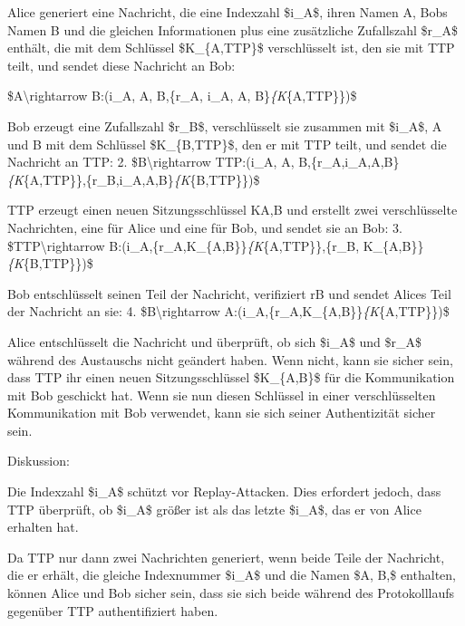 \documentclass[a4paper]{article}
\begin{document}
\begin{multicols}{3}
\begin{itemize*}
            \begin{itemize*}
                  \item Alice generiert eine Nachricht, die eine Indexzahl \$i\_A\$, ihren Namen A, Bobs Namen B und die gleichen Informationen plus eine zusätzliche Zufallszahl \$r\_A\$ enthält, die mit dem Schlüssel \$K\_\{A,TTP\}\$ verschlüsselt ist, den sie mit TTP teilt, und sendet diese Nachricht an Bob:
                  \begin{enumerate*} \def\labelenumi{\arabic{enumi}.} \item \$A\textbackslash rightarrow B:(i\_A, A, B,\{r\_A, i\_A, A, B\}\emph{\{K}\{A,TTP\}\})\$ \end{enumerate*}
                  \item Bob erzeugt eine Zufallszahl \$r\_B\$, verschlüsselt sie zusammen mit \$i\_A\$, A und B mit dem Schlüssel \$K\_\{B,TTP\}\$, den er mit TTP teilt, und sendet die Nachricht an TTP: 2. \$B\textbackslash rightarrow TTP:(i\_A, A, B,\{r\_A,i\_A,A,B\}\emph{\{K}\{A,TTP\}\},\{r\_B,i\_A,A,B\}\emph{\{K}\{B,TTP\}\})\$
                  \item TTP erzeugt einen neuen Sitzungsschlüssel KA,B und erstellt zwei verschlüsselte Nachrichten, eine für Alice und eine für Bob, und sendet sie an Bob: 3. \$TTP\textbackslash rightarrow B:(i\_A,\{r\_A,K\_\{A,B\}\}\emph{\{K}\{A,TTP\}\},\{r\_B, K\_\{A,B\}\}\emph{\{K}\{B,TTP\}\})\$
                  \item Bob entschlüsselt seinen Teil der Nachricht, verifiziert rB und sendet Alices Teil der Nachricht an sie: 4. \$B\textbackslash rightarrow A:(i\_A,\{r\_A,K\_\{A,B\}\}\emph{\{K}\{A,TTP\}\})\$
                  \item Alice entschlüsselt die Nachricht und überprüft, ob sich \$i\_A\$ und \$r\_A\$ während des Austauschs nicht geändert haben. Wenn nicht, kann sie sicher sein, dass TTP ihr einen neuen Sitzungsschlüssel \$K\_\{A,B\}\$ für die Kommunikation mit Bob geschickt hat. Wenn sie nun diesen Schlüssel in einer verschlüsselten Kommunikation mit Bob verwendet, kann sie sich seiner Authentizität sicher sein.
            \end{itemize*}
            \item
            Diskussion:

            \begin{itemize*}
                  \item Die Indexzahl \$i\_A\$ schützt vor Replay-Attacken. Dies erfordert jedoch, dass TTP überprüft, ob \$i\_A\$ größer ist als das letzte \$i\_A\$, das er von Alice erhalten hat.
                  \item Da TTP nur dann zwei Nachrichten generiert, wenn beide Teile der Nachricht, die er erhält, die gleiche Indexnummer \$i\_A\$ und die Namen \$A, B,\$ enthalten, können Alice und Bob sicher sein, dass sie sich beide während des Protokolllaufs gegenüber TTP authentifiziert haben.
            \end{itemize*}
      \end{itemize*}



\end{multicols}
\end{document}
